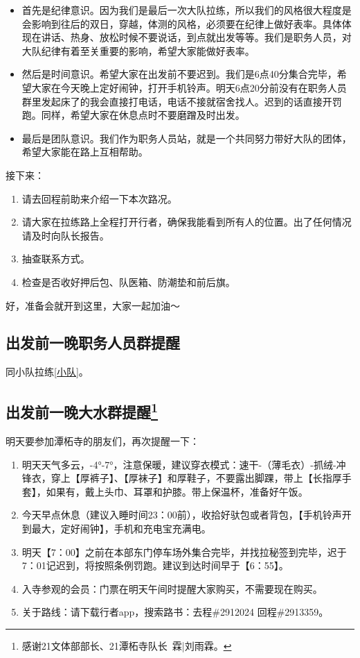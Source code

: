 \documentclass[UTF8]{ctexart}
\begin{document}
\begin{itemize}[nosep,left=4em]
    \item 首先是纪律意识。因为我们是最后一次大队拉练，所以我们的风格很大程度是会影响到往后的双日，穿越，体测的风格，必须要在纪律上做好表率。具体体现在讲话、热身、放松时候不要说话，到点就出发等等。我们是职务人员，对大队纪律有着至关重要的影响，希望大家能做好表率。
    \item 然后是时间意识。希望大家在出发前不要迟到。我们是6点40分集合完毕，希望大家在今天晚上定好闹钟，打开手机铃声。明天6点20分前没有在职务人员群里发起床了的我会直接打电话，电话不接就宿舍找人。迟到的话直接开罚跑。同样，希望大家在休息点时不要磨蹭及时出发。
    \item 最后是团队意识。我们作为职务人员站，就是一个共同努力带好大队的团体，希望大家能在路上互相帮助。
\end{itemize}

接下来：
\begin{enumerate}[nosep,left=4em]
    \item 请去回程前助来介绍一下本次路况。
    \item 请大家在拉练路上全程打开行者，确保我能看到所有人的位置。出了任何情况请及时向队长报告。
    \item 抽查联系方式。
    \item 检查是否收好押后包、队医箱、防潮垫和前后旗。
\end{enumerate}

好，准备会就开到这里，大家一起加油～

\subsection{出发前一晚职务人员群提醒}

同小队拉练\ref{小队}。

\subsection[出发前一晚大水群提醒]{出发前一晚大水群提醒\protect\footnote{感谢21文体部部长、21潭柘寺队长\ 霖|刘雨霖。}}

明天要参加潭柘寺的朋友们，再次提醒一下：
\begin{enumerate}[nosep,left=4em]
    \item 明天天气多云，-4°-7°，注意保暖，建议穿衣模式：速干-（薄毛衣）-抓绒-冲锋衣，穿上【厚裤子】、【厚袜子】和厚鞋子，不要露出脚踝，带上【长指厚手套】，如果有，戴上头巾、耳罩和护膝。带上保温杯，准备好午饭。
    \item 今天早点休息（建议入睡时间23：00前），收拾好驮包或者背包，【手机铃声开到最大，定好闹钟】，手机和充电宝充满电。
    \item 明天【7：00】之前在本部东门停车场外集合完毕，并找拉秘签到完毕，迟于7：01记迟到，将按照条例罚跑。建议到达时间早于【6：55】。
    \item 入寺参观的会员：门票在明天午间时提醒大家购买，不需要现在购买。
    \item 关于路线：请下载行者app，搜索路书：去程\#2912024 回程\#2913359。
\end{enumerate}
\end{document}
